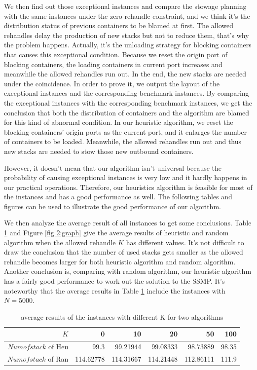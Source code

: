 \documentclass[review,3p,times,authoryear,12pt]{elsarticle}
\begin{document}
We then find out those exceptional instances and compare the stowage planning with the same instances under the zero rehandle constraint, and we think it's the distribution status of previous containers to be blamed at first.
The allowed rehandles delay the production of new stacks but not to reduce them, that's why the problem happens.
Actually, it's the unloading strategy for blocking containers that causes this exceptional condition.
Because we reset the origin port of blocking containers, the loading containers in current port increases and meanwhile the allowed rehandles run out.
In the end, the new stacks are needed under the coincidence.
In order to prove it, we output the layout of the exceptional instances and the corresponding benchmark instances.
By comparing the exceptional instances with the corresponding benchmark instances, we get the conclusion that both the distribution of containers and the algorithm are blamed for this kind of abnormal condition.
In our heuristic algorithm, we reset the blocking containers' origin ports as the current port, and it enlarges the number of containers to be loaded.
Meanwhile, the allowed rehandles run out and thus new stacks are needed to stow those new outbound containers.

However, it doesn't mean that our algorithm isn't universal because the probability of causing exceptional instances is very low and it hardly happens in our practical operations.
Therefore, our heuristics algorithm is feasible for most of the instances and has a good performance as well.
The following tables and figures can be used to illustrate the good performance of our algorithm.

We then analyze the average result of all instances to get some conclusions.
Table \ref{tab:4} and Figure \ref{fig 2:graph} give the average results of heuristic and random algorithm when the allowed rehandle $K$ has different values.
It's not difficult to draw the conclusion that the number of used stacks gets smaller as the allowed rehandle becomes larger for both heuristic algorithm and random algorithm.
Another conclusion is, comparing with random algorithm, our heuristic algorithm has a fairly good performance to work out the solution to the SSMP.
It's noteworthy that the average results in Table \ref{tab:4} include the instances with $N=5000$.

\begin{table}[htbp]
  \centering
  \setlength{\belowcaptionskip}{10pt}
  \caption{average results of the instances with different K for two algorithms}
    \begin{tabular}{r|r|r|r|r|r}
    \hline
     $K$       &0   &10  &20  &50  &100\\
    \hline
    $Numofstack$ of Heu   &99.3  &99.21944  &99.08333   &98.73889  &98.35\\
 \hline
    $Numofstack$ of Ran  &114.62778  &114.31667  &114.21448  &112.86111 &111.9\\
 \hline
    \end{tabular}
  \label{tab:4}
\end{table}
\end{document}
